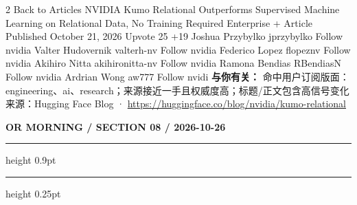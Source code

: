 \documentclass[10.5pt]{ctexart}
\begin{document}
\begin{multicols}{2}
Back to Articles NVIDIA Kumo Relational Outperforms Supervised Machine Learning on Relational Data, No Training Required Enterprise + Article Published October 21, 2026 Upvote 25 +19 Joshua Przybylko jprzybylko Follow nvidia Valter Hudovernik valterh-nv Follow nvidia Federico Lopez flopeznv Follow nvidia Akihiro Nitta akihironitta-nv Follow nvidia Ramona Bendias RBendiasN Follow nvidia Ardrian Wong aw777 Follow nvidi
\textbf{与你有关：} 命中用户订阅版面：engineering、ai、research；来源接近一手且权威度高；标题/正文包含高信号变化
{\footnotesize\color{ormuted} 来源：Hugging Face Blog · \url{https://huggingface.co/blog/nvidia/kumo-relational}}
\end{multicols}
\newpage
{\small\bfseries OR MORNING / SECTION 08 / 2026-10-26}
\vspace{2mm}
\hrule height 0.9pt
\vspace{1.5mm}
\hrule height 0.25pt
\vspace{4mm}
\end{document}
